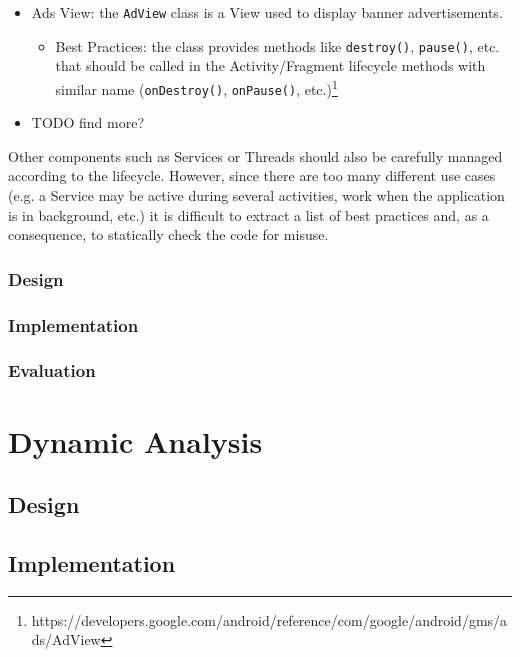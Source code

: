 \documentclass[11pt,a4paper,notitlepage]{article}
\begin{document}
\begin{itemize}
\begin{itemize}
		\end{itemize}
	\item Ads View: the \texttt{AdView} class is a View used to display banner advertisements.
	\begin{itemize}
		\item Best Practices: the class provides methods like \texttt{destroy()}, \texttt{pause()}, etc. that should be called in the Activity/Fragment lifecycle methods with similar name (\texttt{onDestroy()}, \texttt{onPause()}, etc.)\footnote{https://developers.google.com/android/reference/com/google/android/gms/ads/AdView}
	\end{itemize}
	\item TODO find more?
\end{itemize}
Other components such as Services or Threads should also be carefully managed according to the lifecycle. However, since there are too many different use cases (e.g. a Service may be active during several activities, work when the application is in background, etc.) it is difficult to extract a list of best practices and, as a consequence, to statically check the code for misuse.

\subsubsection{Design}

\subsubsection{Implementation}

\subsubsection{Evaluation}



\section{Dynamic Analysis}

\subsection{Design}

\subsection{Implementation}
\end{document}
